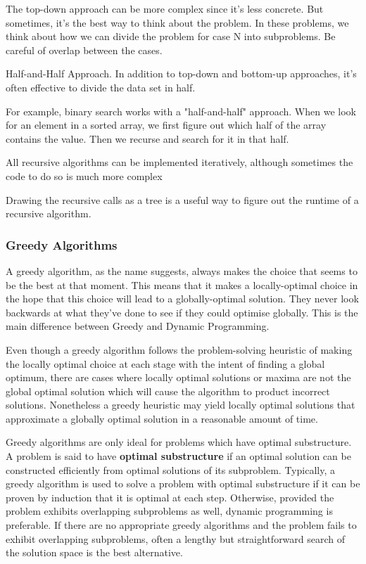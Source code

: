 \documentclass{article}
\begin{document}
    The top-down approach can be more complex since it's less concrete. But sometimes, it's the best way to think about the problem. In these problems, we think about how we can divide the problem for case N into subproblems. Be careful of overlap between the cases. 
    
    Half-and-Half Approach. In addition to top-down and bottom-up approaches, it's often effective to divide the data set in half. 
    
    For example, binary search works with a "half-and-half" approach. When we look for an element in a sorted array, we first figure out which half of the array contains the value. Then we recurse and search for it in that half.
    
    All recursive algorithms can be implemented iteratively, although sometimes the code to do so is much more complex
    
    Drawing the recursive calls as a tree is a useful way to figure out the runtime of a recursive algorithm. 
    
    \subsubsection{Greedy Algorithms}
    A greedy algorithm, as the name suggests, always makes the choice that seems to be the best at that moment. This means that it makes a locally-optimal choice in the hope that this choice will lead to a globally-optimal solution. They never look backwards at what they’ve done to see if they could optimise globally. This is the main difference between Greedy and Dynamic Programming.

    Even though a greedy algorithm follows the problem-solving heuristic of making the locally optimal choice at each stage with the intent of finding a global optimum, there are cases where locally optimal solutions or maxima are not the global optimal solution which will cause the algorithm to product incorrect solutions. Nonetheless a greedy heuristic may yield locally optimal solutions that approximate a globally optimal solution in a reasonable amount of time.
    
    Greedy algorithms are only ideal for problems which have optimal substructure. A problem is said to have \textbf{optimal substructure} if an optimal solution can be constructed efficiently from optimal solutions of its subproblem. Typically, a greedy algorithm is used to solve a problem with optimal substructure if it can be proven by induction that it is optimal at each step. Otherwise, provided the problem exhibits overlapping subproblems as well, dynamic programming is preferable. If there are no appropriate greedy algorithms and the problem fails to exhibit overlapping subproblems, often a lengthy but straightforward search of the solution space is the best alternative.
    
\end{document}

